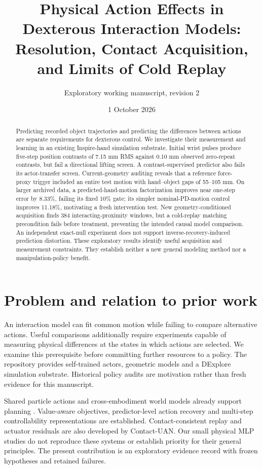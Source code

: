 \documentclass[10pt]{article}
\title{Physical Action Effects in Dexterous Interaction Models:\\Resolution, Contact Acquisition, and Limits of Cold Replay}
\author{Exploratory working manuscript, revision 2}
\date{1 October 2026}
\begin{document}
\maketitle
\begin{abstract}
Predicting recorded object trajectories and predicting the differences between actions
are separate requirements for dexterous control. We investigate their measurement and
learning in an existing Inspire-hand simulation substrate. Initial wrist pulses produce
five-step position contrasts of 7.15 mm RMS against 0.10 mm observed zero-repeat contrasts,
but fail a directional lifting screen. A contrast-supervised predictor also fails its
actor-transfer screen. Current-geometry auditing reveals that a reference force-proxy
trigger included an entire test motion with hand--object gaps of 55--105 mm. On larger
archived data, a predicted-hand-motion factorization improves near one-step error by
8.33\%, failing its fixed 10\% gate; its simpler nominal-PD-motion control improves
11.18\%, motivating a fresh intervention test. New geometry-conditioned acquisition
finds 384 interacting-proximity windows, but a cold-replay matching precondition fails
before treatment, preventing the intended causal model comparison. An independent
exact-null experiment does not support inverse-recovery-induced prediction distortion.
These exploratory results identify useful acquisition and measurement constraints.
They establish neither a new general modeling method nor a manipulation-policy benefit.
\end{abstract}

\section{Problem and relation to prior work}
An interaction model can fit common motion while failing to compare alternative actions.
Useful comparisons additionally require experiments capable of measuring physical
differences at the states in which actions are selected. We examine this prerequisite
before committing further resources to a policy. The repository provides self-trained
actors, geometric models and a DExplore simulation substrate\cite{xu2025}. Historical
policy audits are motivation rather than fresh evidence for this manuscript.

Shared particle actions and cross-embodiment world models already support planning
\cite{he2025}. Value-aware objectives\cite{farahmand2017}, predictor-level action
recovery\cite{qiu2026} and multi-step controllability representations\cite{rudolph2024}
are established. Contact-consistent replay and actuator residuals are also developed
by Contact-UAN\cite{fey2026}. Our small physical MLP studies do not reproduce these
systems or establish priority for their general principles. The present contribution
is an exploratory evidence record with frozen hypotheses and retained failures.
\end{document}
